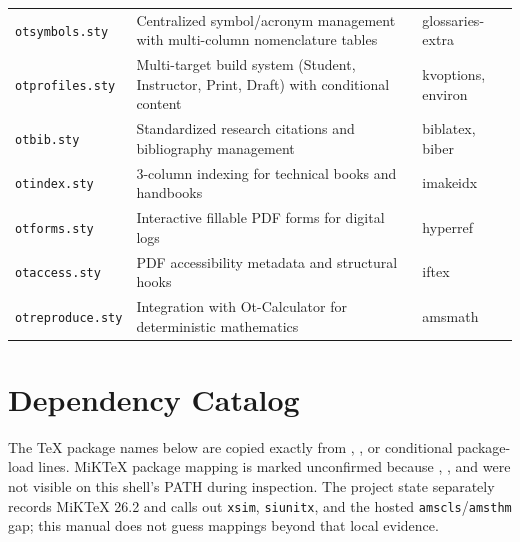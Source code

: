 \documentclass[10pt,a4paper]{article}
\newcommand{\code}[1]{\texttt{\small\detokenize{#1}}}
\newcommand{\pkg}[1]{\texttt{#1}}
\begin{document}
\begin{longtable}{p{}p{}p{}}
  \pkg{otsymbols.sty}     & Centralized symbol/acronym management with multi-column nomenclature tables              & glossaries-extra \\
  \pkg{otprofiles.sty}    & Multi-target build system (Student, Instructor, Print, Draft) with conditional content   & kvoptions, environ \\
  \pkg{otbib.sty}         & Standardized research citations and bibliography management                              & biblatex, biber \\
  \pkg{otindex.sty}       & 3-column indexing for technical books and handbooks                                      & imakeidx \\
  \pkg{otforms.sty}       & Interactive fillable PDF forms for digital logs                                          & hyperref \\
  \pkg{otaccess.sty}      & PDF accessibility metadata and structural hooks                                          & iftex \\
  \pkg{otreproduce.sty}   & Integration with Ot-Calculator for deterministic mathematics                             & amsmath \\
  \bottomrule
\end{longtable}

\section{Dependency Catalog}

The TeX package names below are copied exactly from \code{\RequirePackage}, \code{\LoadClass}, or conditional package-load lines. MiKTeX package mapping is marked unconfirmed because \code{mpm}, \code{initexmf}, and \code{latexmk} were not visible on this shell's PATH during inspection. The project state separately records MiKTeX 26.2 and calls out \pkg{xsim}, \pkg{siunitx}, and the hosted \pkg{amscls}/\pkg{amsthm} gap; this manual does not guess mappings beyond that local evidence.
\end{document}
